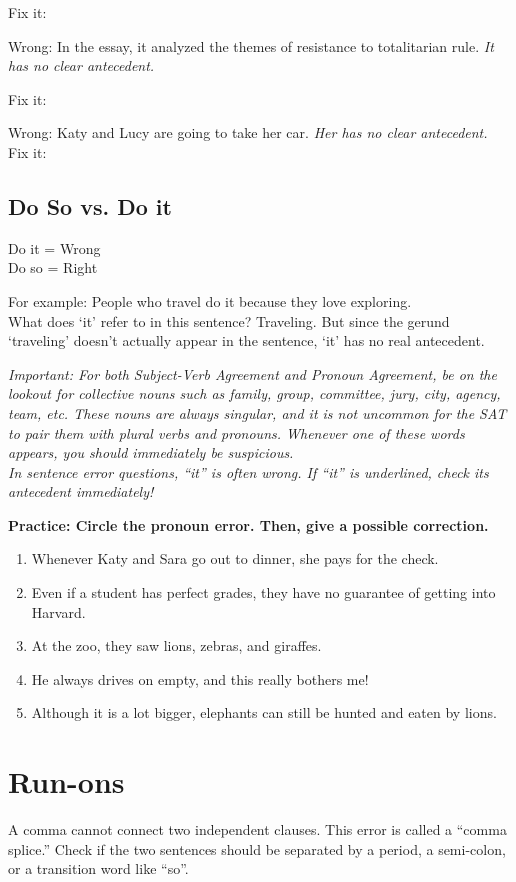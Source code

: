 \documentclass[12pt]{book}
\begin{document}
\bigskip
Fix it: \hrulefill

\bigskip
Wrong: In the essay, it analyzed the themes of resistance to totalitarian rule.
\textit{It has no clear antecedent.}

\bigskip
Fix it: \hrulefill

\bigskip
Wrong: Katy and Lucy are going to take her car.
\textit{Her has no clear antecedent.}
Fix it: \hrulefill

\subsection{Do So vs. Do it}

Do it = Wrong \\
Do so = Right 

\bigskip
For example: People who travel do it because they love exploring.\\
What does `it' refer to in this sentence? Traveling. But since the gerund `traveling' doesn't actually appear in the sentence, `it' has no real antecedent.

\bigskip
\textit{Important:
For both Subject-Verb Agreement and Pronoun Agreement, be on the lookout for collective nouns such as family, group, committee, jury, city, agency, team, etc. These nouns are always singular, and it is not uncommon for the SAT to pair them with plural verbs and pronouns. Whenever one of these words appears, you should immediately be suspicious.\\
In sentence error questions, ``it'' is often wrong.  If ``it'' is underlined, check its antecedent immediately!}

\bigskip
\textbf{Practice: Circle the pronoun error. Then, give a possible correction.}
\begin{enumerate}
\item{Whenever Katy and Sara go out to dinner, she pays for the check.}
\item{Even if a student has perfect grades, they have no guarantee of getting into Harvard.}
\item{At the zoo, they saw lions, zebras, and giraffes.}
\item{He always drives on empty, and this really bothers me!}
\item{Although it is a lot bigger, elephants can still be hunted and eaten by lions.}
\end{enumerate}


\section{Run-ons}
A comma cannot connect two independent clauses.  This error is called a ``comma splice.'' Check if the two sentences should be separated by a period, a semi-colon, or a transition word like ``so''.
\end{document}
